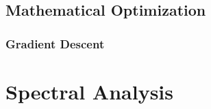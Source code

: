 \documentclass[11pt, oneside, a4paper]{report}
\begin{document}
\subsection{Mathematical Optimization}\label{optimization}


\subsubsection{Gradient Descent}


\section{Spectral Analysis}















\end{document}
